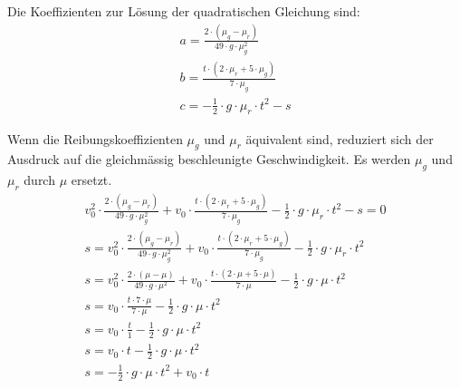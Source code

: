 Die Koeffizienten zur Lösung der quadratischen Gleichung sind:
\begin{align}
    a = \frac{2 \cdot (\mu_g - \mu_r)}{49 \cdot g \cdot \mu_g^2}\\
    b = \frac{t \cdot (2 \cdot \mu_r + 5 \cdot \mu_g)}{7 \cdot \mu_g}\\
    c = - \frac{1}{2} \cdot g \cdot \mu_r \cdot t^2 - s
\end{align}

Wenn die Reibungskoeffizienten $\mu_g$ und $\mu_r$ äquivalent sind, reduziert sich der Ausdruck auf die gleichmässig beschleunigte
Geschwindigkeit. Es werden $\mu_g$ und $\mu_r$ durch $\mu$ ersetzt.
\begin{align}
    v_0^2 \cdot \frac{2 \cdot (\mu_g - \mu_r)}{49 \cdot g \cdot \mu_g^2} + v_0 \cdot \frac{t \cdot (2 \cdot \mu_r + 5 \cdot \mu_g)}{7 \cdot \mu_g} - \frac{1}{2} \cdot g \cdot \mu_r \cdot t^2 - s = 0\\
    s = v_0^2 \cdot \frac{2 \cdot (\mu_g - \mu_r)}{49 \cdot g \cdot \mu_g^2} + v_0 \cdot \frac{t \cdot (2 \cdot \mu_r + 5 \cdot \mu_g)}{7 \cdot \mu_g} - \frac{1}{2} \cdot g \cdot \mu_r \cdot t^2\\
    s = v_0^2 \cdot \frac{2 \cdot (\mu - \mu)}{49 \cdot g \cdot \mu^2} + v_0 \cdot \frac{t \cdot (2 \cdot \mu + 5 \cdot \mu)}{7 \cdot \mu} - \frac{1}{2} \cdot g \cdot \mu \cdot t^2\\
    s = v_0 \cdot \frac{t \cdot 7 \cdot \mu}{7 \cdot \mu} - \frac{1}{2} \cdot g \cdot \mu \cdot t^2\\
    s = v_0 \cdot \frac{t}{1} - \frac{1}{2} \cdot g \cdot \mu \cdot t^2\\
    s = v_0 \cdot t - \frac{1}{2} \cdot g \cdot \mu \cdot t^2\\
    s = - \frac{1}{2} \cdot g \cdot \mu \cdot t^2 + v_0 \cdot t
\end{align}